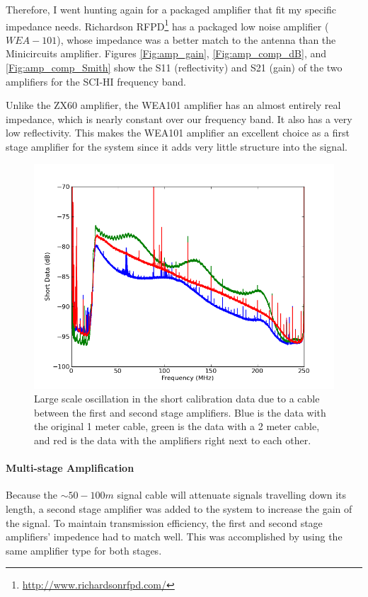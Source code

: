 Therefore, I went hunting again for a packaged amplifier that fit my specific impedance needs. Richardson RFPD\footnote{\url{http://www.richardsonrfpd.com/}} has a packaged low noise amplifier ($WEA-101$), whose impedance was a better match to the antenna than the Minicircuits amplifier. Figures \ref{Fig:amp_gain}, \ref{Fig:amp_comp_dB}, and \ref{Fig:amp_comp_Smith} show the S11 (reflectivity) and S21 (gain) of the two amplifiers for the SCI-HI frequency band. 

Unlike the ZX60 amplifier, the WEA101 amplifier has an almost entirely real impedance, which is nearly constant over our frequency band. It also has a very low reflectivity. This makes the WEA101 amplifier an excellent choice as a first stage amplifier for the system since it adds very little structure into the signal. 

\begin{figure}[htb]
\begin{center}
\includegraphics[width=0.9\linewidth]{SCIHI_system/figures/antenna_rf_cable_reflections.png}
\caption{Large scale oscillation in the short calibration data due to a cable between the first and second stage amplifiers. Blue is the data with the original 1 meter cable, green is the data with a 2 meter cable, and red is the data with the amplifiers right next to each other.}
\label{Fig:amp_reflect}
\end{center}
\end{figure}

\paragraph{Multi-stage Amplification}
Because the $\sim 50-100 m$ signal cable will attenuate signals travelling down its length, a second stage amplifier was added to the system to increase the gain of the signal. To maintain transmission efficiency, the first and second stage amplifiers' impedence had to match well. This was accomplished by using the same amplifier type for both stages. 

